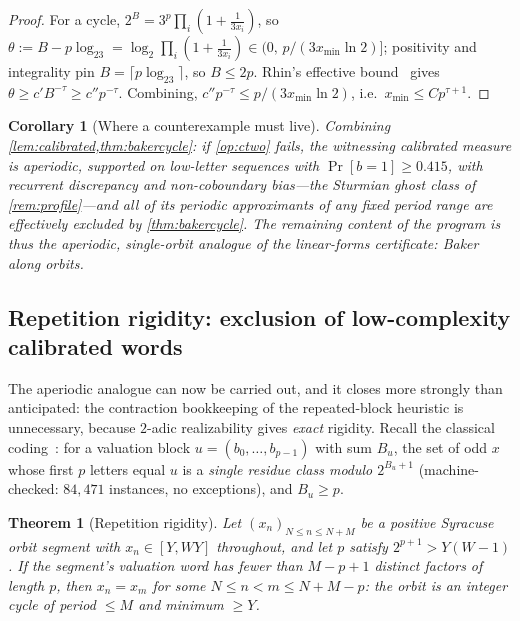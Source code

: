 \documentclass[11pt]{article}
\theoremstyle{plain}
\newtheorem{theorem}{Theorem}
\newtheorem{corollary}{Corollary}
\theoremstyle{definition}
\theoremstyle{remark}
\begin{document}
\begin{proof}
For a cycle, $2^B=3^p\prod_i(1+\tfrac1{3x_i})$, so
$\theta:=B-p\log_23=\log_2\prod_i(1+\tfrac1{3x_i})\in
\bigl(0,\,p/(3x_{\min}\ln2)\bigr]$; positivity and integrality pin
$B=\lceil p\log_23\rceil$, so $B\le2p$. Rhin's effective bound~\cite{rhin1987} gives
$\theta\ge c'B^{-\tau}\ge c''p^{-\tau}$. Combining,
$c''p^{-\tau}\le p/(3x_{\min}\ln2)$, i.e.\
$x_{\min}\le C p^{\tau+1}$.
\end{proof}

\begin{corollary}[Where a counterexample must live]\label{cor:ghostclass}
Combining \cref{lem:calibrated,thm:bakercycle}: if \cref{op:ctwo} fails,
the witnessing calibrated measure is \emph{aperiodic}, supported on
low-letter sequences with $\Pr[b{=}1]\ge0.415$, with recurrent
discrepancy and non-coboundary bias---the Sturmian ghost class of
\cref{rem:profile}---and all of its periodic approximants of any fixed
period range are effectively excluded by \cref{thm:bakercycle}. The
remaining content of the program is thus the aperiodic, single-orbit
analogue of the linear-forms certificate: \emph{Baker along orbits}.
\end{corollary}

\subsection*{Repetition rigidity: exclusion of low-complexity calibrated
words}

The aperiodic analogue can now be carried out, and it closes more
strongly than anticipated: the contraction bookkeeping of the
repeated-block heuristic is unnecessary, because $2$-adic realizability
gives \emph{exact} rigidity. Recall the classical
coding~\cite{terras1976,everett1977,bernsteinlagarias}: for a
valuation block $u=(b_0,\dots,b_{p-1})$ with sum $B_u$, the set of odd
$x$ whose first $p$ letters equal $u$ is a \emph{single residue class
modulo $2^{B_u+1}$} (machine-checked: $84{,}471$ instances, no
exceptions), and $B_u\ge p$.

\begin{theorem}[Repetition rigidity]\label{thm:repetition}
Let $(x_n)_{N\le n\le N+M}$ be a positive Syracuse orbit segment with
$x_n\in[Y,WY]$ throughout, and let $p$ satisfy $2^{p+1}>Y(W-1)$. If the
segment's valuation word has fewer than $M-p+1$ distinct factors of
length $p$, then $x_n=x_m$ for some $N\le n<m\le N+M-p$: the orbit is an
integer cycle of period $\le M$ and minimum $\ge Y$.
\end{theorem}
\end{document}
